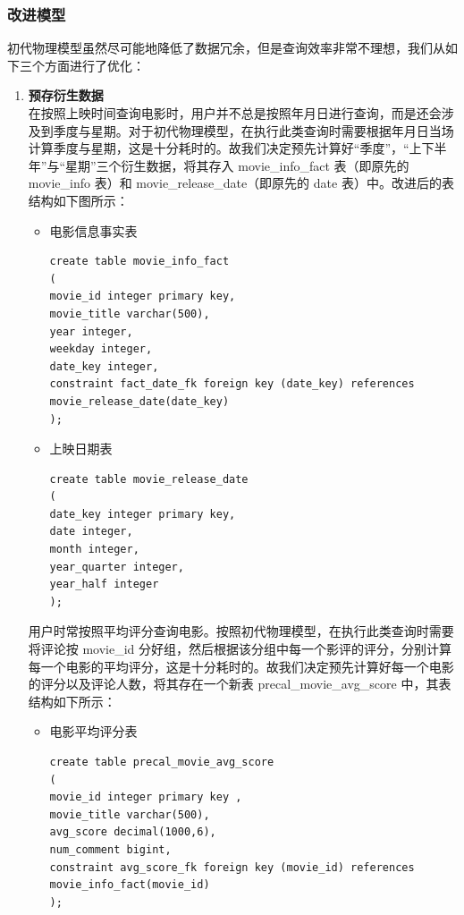 \documentclass{ctexrep}
\begin{document}
    \subsubsection{改进模型} \label{mysql:2}
    初代物理模型虽然尽可能地降低了数据冗余，但是查询效率非常不理想，我们从如下三个方面进行了优化：
    \begin{enumerate}
        \item \textbf{预存衍生数据}\\
        在按照上映时间查询电影时，用户并不总是按照年月日进行查询，而是还会涉及到季度与星期。对于初代物理模型，在执行此类查询时需要根据年月日当场计算季度与星期，这是十分耗时的。故我们决定预先计算好“季度”，“上下半年”与“星期”三个衍生数据，将其存入 movie\_info\_fact 表（即原先的 movie\_info 表）和 movie\_release\_date（即原先的 date 表）中。改进后的表结构如下图所示：
        \begin{itemize}
            \item 电影信息事实表
                \begin{lstlisting}
create table movie_info_fact
(
movie_id integer primary key,
movie_title varchar(500),
year integer,
weekday integer,
date_key integer,
constraint fact_date_fk foreign key (date_key) references movie_release_date(date_key)
);
                \end{lstlisting}
            \item 上映日期表
                \begin{lstlisting}
create table movie_release_date
(
date_key integer primary key,
date integer,
month integer,
year_quarter integer,
year_half integer
);
                \end{lstlisting}
        \end{itemize}
        用户时常按照平均评分查询电影。按照初代物理模型，在执行此类查询时需要将评论按 movie\_id 分好组，然后根据该分组中每一个影评的评分，分别计算每一个电影的平均评分，这是十分耗时的。故我们决定预先计算好每一个电影的评分以及评论人数，将其存在一个新表 precal\_movie\_avg\_score 中，其表结构如下所示：
        \begin{itemize}
            \item 电影平均评分表
                \begin{lstlisting}
create table precal_movie_avg_score
(
movie_id integer primary key ,
movie_title varchar(500),
avg_score decimal(1000,6),
num_comment bigint,
constraint avg_score_fk foreign key (movie_id) references movie_info_fact(movie_id)
);
                \end{lstlisting}
        \end{itemize}

\end{enumerate}
\end{document}
